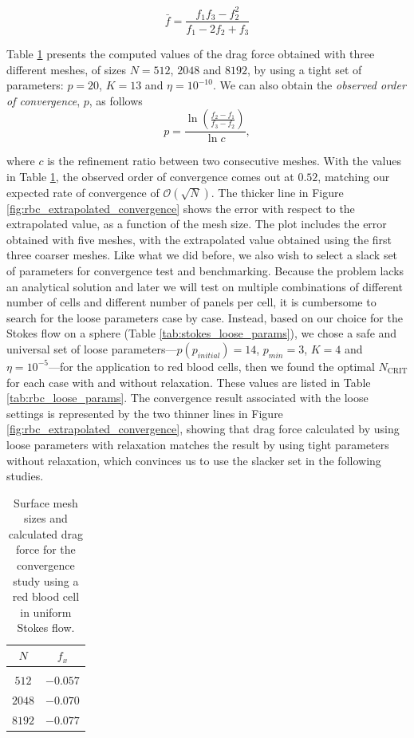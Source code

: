 \documentclass[final,3p,times]{elsarticle}
\renewcommand{\O}[1]{\mathcal{O}(#1)}
\newcommand{\ncrit}{N_{\text{CRIT}}}
\begin{document}
\begin{equation}
	\bar{f} = \frac{f_1f_3-f_2^{2}}{f_1 -2f_2+f_3}
\end{equation}

Table \ref{tab:rbc_richardson_values} presents the computed values of the drag force obtained with three different meshes, of sizes $N=512$, $2048$ and $8192$, by using a tight set of parameters: $p=20$, $K=13$ and $\eta=10^{-10}$. We can also obtain the \emph{observed order of convergence}, $p$, as follows
%
\begin{equation}
	p = \frac{\ln{\left(\frac{f_2-f_1}{f_3-f_2}\right)}}{\ln{c}},
\end{equation}

\noindent where $c$ is the refinement ratio between two consecutive meshes. With the values in Table \ref{tab:rbc_richardson_values}, the observed order of convergence comes out at $0.52$, matching our expected rate of convergence of $\O{\sqrt{N}}$. 
The thicker line in Figure \ref{fig:rbc_extrapolated_convergence} shows the error with respect to the extrapolated value, as a function of the mesh size. The plot includes the error obtained with five meshes, with the extrapolated value obtained using the first three coarser meshes. Like what we did before, we also wish to select a slack set of parameters for convergence test and benchmarking. Because the problem lacks an analytical solution and later we will test on multiple combinations of different number of cells and different number of panels per cell, it is cumbersome to search for the loose parameters case by case. Instead, based on our choice for the Stokes flow on a sphere (Table \ref{tab:stokes_loose_params}), we chose a safe and universal set of loose parameters---$p \left( p_{initial} \right) = 14$, $p_{min}=3$, $K=4$ and $\eta=10^{-5}$---for the application to red blood cells, then we found the optimal $\ncrit$ for each case with and without relaxation. These values are listed in Table \ref{tab:rbc_loose_params}. The convergence result associated with the loose settings is represented by the two thinner lines in Figure \ref{fig:rbc_extrapolated_convergence}, showing that drag force calculated by using loose parameters with relaxation matches the result by using tight parameters without relaxation, which convinces us to use the slacker set in the following studies. 

\begin{table}[h]
\footnotesize
\begin{center}
\begin{tabular}{c|c}
	$N$ & $f_x$ \\
	\hline
	& \\
	$512$ & $-0.057$ \\
	$2048$ & $-0.070$ \\ 
	$8192$ & $-0.077$ \\
\end{tabular}
\end{center}
\caption{Surface mesh sizes and calculated drag force for the convergence study using a red blood cell in uniform Stokes flow.}
\label{tab:rbc_richardson_values}
\end{table}%
\end{document}
